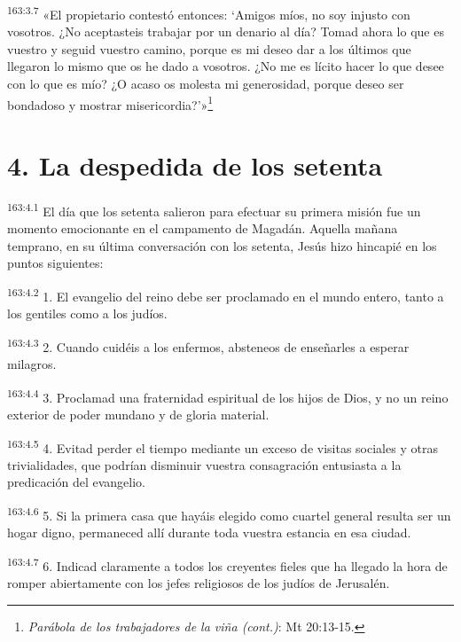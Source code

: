 \par
\textsuperscript{163:3.7} «El propietario contestó entonces: `Amigos míos, no soy injusto con vosotros. ¿No aceptasteis trabajar por un denario al día? Tomad ahora lo que es vuestro y seguid vuestro camino, porque es mi deseo dar a los últimos que llegaron lo mismo que os he dado a vosotros. ¿No me es lícito hacer lo que desee con lo que es mío? ¿O acaso os molesta mi generosidad, porque deseo ser bondadoso y mostrar misericordia?'»\footnote{\textit{Parábola de los trabajadores de la viña (cont.)}: Mt 20:13-15.}

\section*{4. La despedida de los setenta}
\par
\textsuperscript{163:4.1} El día que los setenta salieron para efectuar su primera misión fue un momento emocionante en el campamento de Magadán. Aquella mañana temprano, en su última conversación con los setenta, Jesús hizo hincapié en los puntos siguientes:

\par
\textsuperscript{163:4.2} 1. El evangelio del reino debe ser proclamado en el mundo entero, tanto a los gentiles como a los judíos.

\par
\textsuperscript{163:4.3} 2. Cuando cuidéis a los enfermos, absteneos de enseñarles a esperar milagros.

\par
\textsuperscript{163:4.4} 3. Proclamad una fraternidad espiritual de los hijos de Dios, y no un reino exterior de poder mundano y de gloria material.

\par
\textsuperscript{163:4.5} 4. Evitad perder el tiempo mediante un exceso de visitas sociales y otras trivialidades, que podrían disminuir vuestra consagración entusiasta a la predicación del evangelio.

\par
\textsuperscript{163:4.6} 5. Si la primera casa que hayáis elegido como cuartel general resulta ser un hogar digno, permaneced allí durante toda vuestra estancia en esa ciudad.

\par
\textsuperscript{163:4.7} 6. Indicad claramente a todos los creyentes fieles que ha llegado la hora de romper abiertamente con los jefes religiosos de los judíos de Jerusalén.

